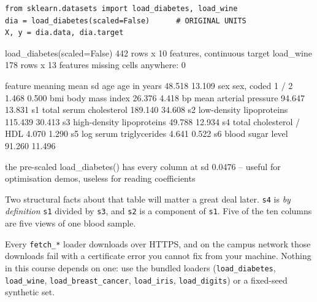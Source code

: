 \documentclass[11pt]{article}
\begin{document}
\begin{lstlisting}
from sklearn.datasets import load_diabetes, load_wine
dia = load_diabetes(scaled=False)      # ORIGINAL UNITS
X, y = dia.data, dia.target
\end{lstlisting}
\begin{codeout}
load_diabetes(scaled=False)  442 rows x 10 features, continuous target
load_wine                    178 rows x 13 features
missing cells anywhere: 0

feature   meaning                         mean       sd
age       age in years                   48.518   13.109
sex       sex, coded 1 / 2                1.468    0.500
bmi       body mass index                26.376    4.418
bp        mean arterial pressure         94.647   13.831
s1        total serum cholesterol       189.140   34.608
s2        low-density lipoproteins      115.439   30.413
s3        high-density lipoproteins      49.788   12.934
s4        total cholesterol / HDL         4.070    1.290
s5        log serum triglycerides         4.641    0.522
s6        blood sugar level              91.260   11.496

the pre-scaled load_diabetes() has every column at sd 0.0476
   -- useful for optimisation demos, useless for reading coefficients
\end{codeout}

Two structural facts about that table will matter a great deal later.
\texttt{s4} is \emph{by definition} \texttt{s1} divided by \texttt{s3}, and
\texttt{s2} is a component of \texttt{s1}. Five of the ten columns are five
views of one blood sample.

\begin{caution}
Every \texttt{fetch\_*} loader downloads over HTTPS, and on the campus network
those downloads fail with a certificate error you cannot fix from your machine.
Nothing in this course depends on one: use the bundled loaders
(\texttt{load\_diabetes}, \texttt{load\_wine}, \texttt{load\_breast\_cancer},
\texttt{load\_iris}, \texttt{load\_digits}) or a fixed-seed synthetic set.
\end{caution}
\end{document}
